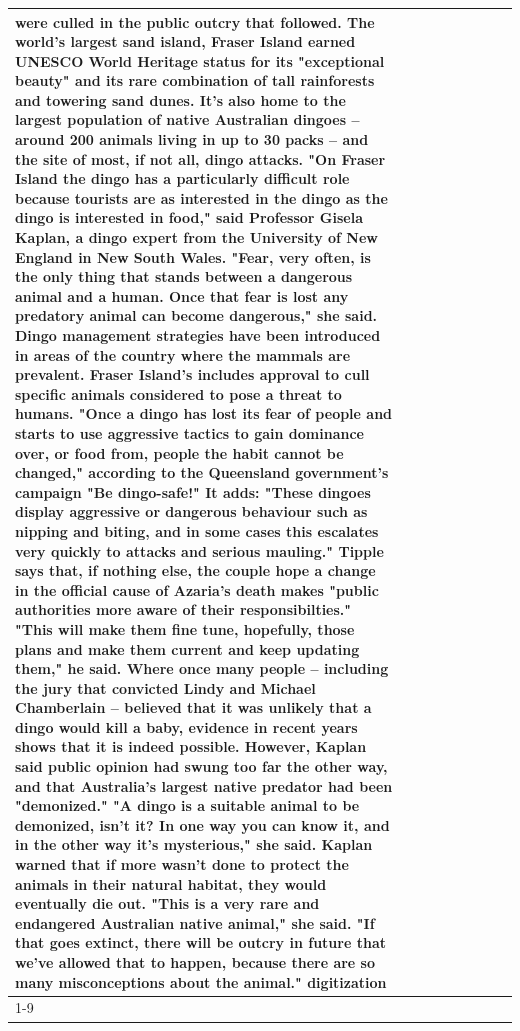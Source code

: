 \begin{table}[H]
\begin{tabular}{lllrlllll}
were culled in the public outcry that followed. The world's largest sand island, Fraser Island earned UNESCO World Heritage status for its "exceptional beauty" and its rare combination of tall rainforests and towering sand dunes. It's also home to the largest population of native Australian dingoes -- around 200 animals living in up to 30 packs -- and the site of most, if not all, dingo attacks. "On Fraser Island the dingo has a particularly difficult role because tourists are as interested in the dingo as the dingo is interested in food," said Professor Gisela Kaplan, a dingo expert from the University of New England in New South Wales. "Fear, very often, is the only thing that stands between a dangerous animal and a human. Once that fear is lost any predatory animal can become dangerous," she said. Dingo management strategies have been introduced in areas of the country where the mammals are prevalent. Fraser Island's includes approval to cull specific animals considered to pose a threat to humans. "Once a dingo has lost its fear of people and starts to use aggressive tactics to gain dominance over, or food from, people the habit cannot be changed," according to the Queensland government's campaign "Be dingo-safe!" It adds: "These dingoes display aggressive or dangerous behaviour such as nipping and biting, and in some cases this escalates very quickly to attacks and serious mauling." Tipple says that, if nothing else, the couple hope a change in the official cause of Azaria's death makes "public authorities more aware of their responsibilties." "This will make them fine tune, hopefully, those plans and make them current and keep updating them," he said. Where once many people -- including the jury that convicted Lindy and Michael Chamberlain -- believed that it was unlikely that a dingo would kill a baby, evidence in recent years shows that it is indeed possible. However, Kaplan said public opinion had swung too far the other way, and that Australia's largest native predator had been "demonized." "A dingo is a suitable animal to be demonized, isn't it? In one way you can know it, and in the other way it's mysterious," she said. Kaplan warned that if more wasn't done to protect the animals in their natural habitat, they would eventually die out. "This is a very rare and endangered Australian native animal," she said. "If that goes extinct, there will be outcry in future that we've allowed that to happen, because there are so many misconceptions about the animal." digitization \\
\cline{1-9}

\end{tabular}
\end{table}

